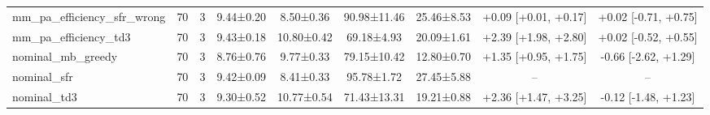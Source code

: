 \begin{table}[t]
\begin{tabular}{lcccccccc}
mm\_pa\_efficiency\_sfr\_wrong & 70 & 3 & 9.44±0.20 & 8.50±0.36 & 90.98±11.46 & 25.46±8.53 & +0.09 [+0.01, +0.17] & +0.02 [-0.71, +0.75] \\
mm\_pa\_efficiency\_td3 & 70 & 3 & 9.43±0.18 & 10.80±0.42 & 69.18±4.93 & 20.09±1.61 & +2.39 [+1.98, +2.80] & +0.02 [-0.52, +0.55] \\
nominal\_mb\_greedy & 70 & 3 & 8.76±0.76 & 9.77±0.33 & 79.15±10.42 & 12.80±0.70 & +1.35 [+0.95, +1.75] & -0.66 [-2.62, +1.29] \\
nominal\_sfr & 70 & 3 & 9.42±0.09 & 8.41±0.33 & 95.78±1.72 & 27.45±5.88 & -- & -- \\
nominal\_td3 & 70 & 3 & 9.30±0.52 & 10.77±0.54 & 71.43±13.31 & 19.21±0.88 & +2.36 [+1.47, +3.25] & -0.12 [-1.48, +1.23] \\
\hline
\end{tabular}
\end{table}
